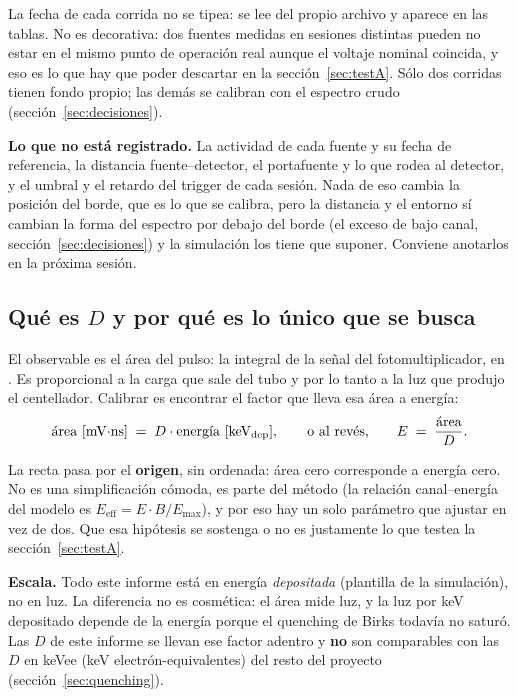 \documentclass[11pt,a4paper]{article}
\begin{document}
La fecha de cada corrida no se tipea: se lee del propio archivo y aparece en
las tablas. No es decorativa: dos fuentes medidas en sesiones distintas
pueden no estar en el mismo punto de operación real aunque el voltaje nominal
coincida, y eso es lo que hay que poder descartar en la
sección~\ref{sec:testA}. Sólo dos corridas tienen fondo propio; las demás se
calibran con el espectro crudo (sección~\ref{sec:decisiones}).

\begin{aviso}
\textbf{Lo que no está registrado.} La actividad de cada fuente y su fecha de
referencia, la distancia fuente--detector, el portafuente y lo que rodea al
detector, y el umbral y el retardo del trigger de cada sesión. Nada de eso
cambia la posición del borde, que es lo que se calibra, pero la distancia y
el entorno sí cambian la forma del espectro por debajo del borde (el exceso
de bajo canal, sección~\ref{sec:decisiones}) y la simulación los tiene que
suponer. Conviene anotarlos en la próxima sesión.
\end{aviso}

\subsection{Qué es $D$ y por qué es lo único que se busca}

El observable es el área del pulso: la integral de la señal del
fotomultiplicador, en \mVns. Es proporcional a la carga que sale del tubo y por
lo tanto a la luz que produjo el centellador. Calibrar es encontrar el factor
que lleva esa área a energía:
\[
   \text{área [mV$\cdot$ns]} \;=\; D \cdot \text{energía [keV\textsubscript{dep}]},
   \qquad\text{o al revés,}\qquad
   E \;=\; \frac{\text{área}}{D}.
\]

La recta pasa por el \textbf{origen}, sin ordenada: área cero corresponde a
energía cero. No es una simplificación cómoda, es parte del método (la relación
canal--energía del modelo es $E_{\text{eff}} = E\cdot B/E_{\max}$), y por eso
hay un solo parámetro que ajustar en vez de dos. Que esa hipótesis se sostenga
o no es justamente lo que testea la sección~\ref{sec:testA}.

\begin{aviso}
\textbf{Escala.} Todo este informe está en energía \emph{depositada}
(plantilla \texttt{\Rama} de la simulación), no en luz. La diferencia no es
cosmética: el área mide luz, y la luz por keV depositado depende de la energía
porque el quenching de Birks todavía no saturó. Las $D$ de este informe se
llevan ese factor adentro y \textbf{no} son comparables con las $D$ en keVee
(keV electrón-equivalentes) del resto del proyecto (sección~\ref{sec:quenching}).
\end{aviso}
\end{document}
